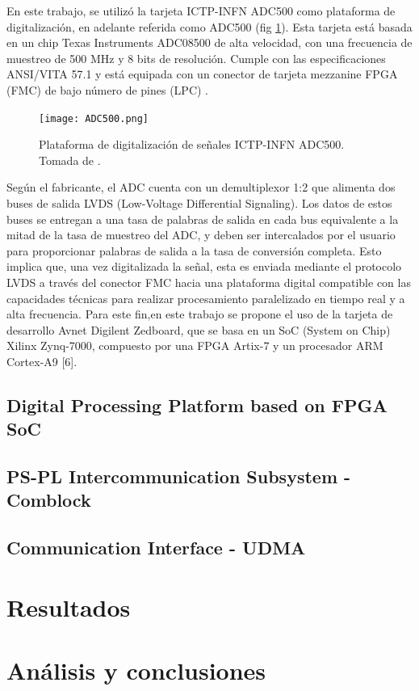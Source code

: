 \documentclass[]{book}
\begin{document}
\noindent En este trabajo, se utilizó la tarjeta ICTP-INFN ADC500 como plataforma de digitalización, en adelante referida como ADC500 (fig \ref{fig:adc500}). Esta tarjeta está basada en un chip Texas Instruments ADC08500 \cite{ti_adc08500} de alta velocidad, con una frecuencia de muestreo de 500 MHz y 8 bits de resolución. Cumple con las especificaciones ANSI/VITA 57.1 y está equipada con un conector de tarjeta mezzanine FPGA (FMC) de bajo número de pines (LPC) \cite{crespo2021remote}.\\

\begin{figure}[h]
    \centering
    \texttt{[image: ADC500.png]}
    \caption{Plataforma de digitalización de señales ICTP-INFN ADC500. Tomada de \cite{ictp_smr3765}.}
    \label{fig:adc500}

\end{figure}

\noindent Según el fabricante, el ADC cuenta con un demultiplexor 1:2 que alimenta dos buses de salida LVDS (Low-Voltage Differential Signaling). Los datos de estos buses se entregan a una tasa de palabras de salida en cada bus equivalente a la mitad de la tasa de muestreo del ADC, y deben ser intercalados por el usuario para proporcionar palabras de salida a la tasa de conversión completa. Esto implica que, una vez digitalizada la señal, esta es enviada mediante el protocolo LVDS a través del conector FMC hacia una plataforma digital compatible con las capacidades técnicas para realizar procesamiento paralelizado en tiempo real y a alta frecuencia. Para este fin,en este trabajo se propone el uso de la tarjeta de desarrollo Avnet Digilent Zedboard, que se basa en un SoC (System on Chip) Xilinx Zynq-7000, compuesto por una FPGA Artix-7 y un procesador ARM Cortex-A9 [6].

\subsection{Digital Processing Platform based on FPGA SoC}
\subsection{PS-PL Intercommunication Subsystem - Comblock}
\subsection{Communication Interface - UDMA}


\section{Resultados}
\section{Análisis y conclusiones}



\end{document}

